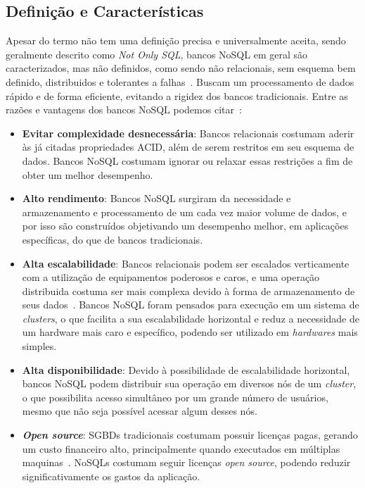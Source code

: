 \subsection{Definição e Características}
Apesar do termo não tem uma definição precisa e universalmente aceita, sendo geralmente descrito como \emph{Not Only SQL}, bancos NoSQL em geral são caracterizados, mas não definidos, como sendo não relacionais, sem esquema bem definido, distribuidos e tolerantes a falhas~\cite{pramod}. Buscam um processamento de dados rápido e de forma eficiente, evitando a rigidez dos bancos tradicionais. 
	Entre as razões e vantagens dos bancos NoSQL podemos citar~\cite{chrisnosql}:
    \begin{itemize}
    \item \textbf{Evitar complexidade desnecessária}: Bancos relacionais costumam aderir às já citadas propriedades ACID, além de serem restritos em seu esquema de dados. Bancos NoSQL costumam ignorar ou relaxar essas restrições a fim de obter um melhor desempenho.
    \item \textbf{Alto rendimento}: Bancos NoSQL surgiram da necessidade e armazenamento e processamento de um cada vez maior volume de dados, e por isso são construídos objetivando um desempenho melhor, em aplicações específicas, do que de bancos tradicionais.
    \item \textbf{Alta escalabilidade}: Bancos relacionais podem ser escalados verticamente com a utilização de equipamentos poderosos e caros, e uma operação distribuida costuma ser mais complexa devido à forma de armazenamento de seus dados~\cite{leavitt2010nosql}. Bancos NoSQL foram pensados para execução em um sistema de \emph{clusters}, o que facilita a sua escalabilidade horizontal e reduz a necessidade de um hardware mais caro e específico, podendo ser utilizado em \emph{hardwares} mais simples. 
    \item \textbf{Alta disponibilidade}: Devido à possibilidade de escalabilidade horizontal, bancos NoSQL podem distribuir sua operação em diversos nós de um \emph{cluster}, o que possibilita acesso simultâneo por um grande número de usuários, mesmo que não seja possível acessar algum desses nós. 
    \item \textbf{\emph{Open source}}: SGBDs tradicionais costumam possuir licenças pagas, gerando um custo financeiro alto, principalmente quando executados em múltiplas maquinas~\cite{pramod}. NoSQLs costumam seguir licenças \emph{open source}, podendo reduzir significativamente os gastos da aplicação. 
\end{itemize}

